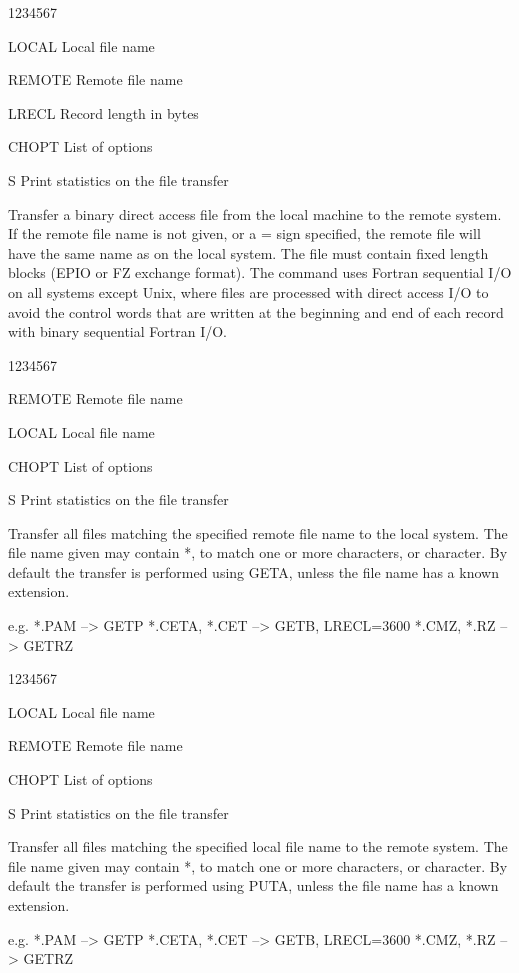 \begin{DLtt}{1234567}
\item[LOCAL]Local file name
\item[REMOTE]Remote file name
\item[LRECL]Record length in bytes
\item[CHOPT]List of options
\begin{DLtt}{12}
\item[S]Print statistics on the file transfer
\end{DLtt}
\end{DLtt}
Transfer a binary direct access
file from the local machine to the remote system.
If the remote file name is not given, or a = sign specified,
the remote file will have the same name as on the local system.
The file must contain fixed length blocks (EPIO
or FZ exchange format).
The  command uses Fortran
sequential I/O on all systems except Unix, where files are
processed with direct access I/O to avoid the control
words that are written at the beginning and end of each
record with binary sequential Fortran I/O.

\begin{DLtt}{1234567}
\item[REMOTE]Remote file name
\item[LOCAL]Local file name
\item[CHOPT]List of options
\begin{DLtt}{12}
\item[S]Print statistics on the file transfer
\end{DLtt}
\end{DLtt}
Transfer all files matching the specified remote file name
to the local system. The file name given may contain
*, to match one or more characters, or %
character.
By default the transfer is performed
using GETA, unless the file name has a known extension.
\begin{XMP}
e.g.
*.PAM         --> GETP
*.CETA, *.CET --> GETB, LRECL=3600
*.CMZ,  *.RZ  --> GETRZ
\end{XMP}

\begin{DLtt}{1234567}
\item[LOCAL]Local file name
\item[REMOTE]Remote file name
\item[CHOPT]List of options
\begin{DLtt}{12}
\item[S]Print statistics on the file transfer
\end{DLtt}
\end{DLtt}
Transfer all files matching the specified local file name
to the remote system. The file name given may contain
*, to match one or more characters, or %
character.
By default the transfer is performed
using PUTA, unless the file name has a known extension.
\begin{XMP}
e.g.
*.PAM         --> GETP
*.CETA, *.CET --> GETB, LRECL=3600
*.CMZ,  *.RZ  --> GETRZ
\end{XMP}
